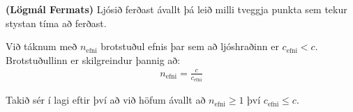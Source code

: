 \begin{tcolorbox}
\begin{theorem}
\textbf{(Lögmál Fermats)} Ljósið ferðast ávallt þá leið milli tveggja punkta sem tekur stystan tíma að ferðast.
\end{theorem}
\end{tcolorbox}


\begin{tcolorbox}
\begin{definition}
Við táknum með $n_{\text{efni}}$ brotstuðul efnis þar sem að ljóshraðinn er $c_{\text{efni}} < c$. Brotstuðullinn er skilgreindur þannig að:
\begin{align*}
    n_{\text{efni}} = \frac{c}{c_{\text{efni}}}
\end{align*}
\end{definition}
\end{tcolorbox}

Takið sér í lagi eftir því að við höfum ávallt að $n_{\text{efni}} \geq 1$ því $c_{\text{efni}} \leq c$.

